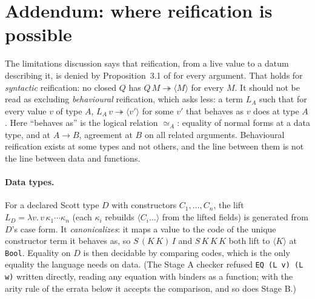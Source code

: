 
\section{Addendum: where reification is possible}\label{app:reify}

The limitations discussion says that reification, from a live value to a datum
describing it, is denied by Proposition~3.1 of \citet{Davis2027} for every
argument.  That holds for \emph{syntactic} reification: no closed $Q$ has
$Q\,M \twoheadrightarrow \langle M\rangle$ for every $M$.  It should not be read
as excluding \emph{behavioural} reification, which asks less: a term $L_A$ such
that for every value $v$ of type $A$, $L_A\,v \twoheadrightarrow \langle v'\rangle$
for some $v'$ that behaves as $v$ does at type $A$.  Here ``behaves as'' is the
logical relation $\simeq_A$: equality of normal forms at a data type, and at
$A \to B$, agreement at $B$ on all related arguments.  Behavioural reification
exists at some types and not others, and the line between them is not the line
between data and functions.

\paragraph{Data types.}  For a declared Scott type $D$ with constructors
$C_1, \ldots, C_n$, the lift $L_D = \lambda v.\, v\,\kappa_1 \cdots \kappa_n$
(each $\kappa_i$ rebuilds $\langle C_i \ldots\rangle$ from the lifted fields)
is generated from $D$'s case form.  It \emph{canonicalizes}: it maps a value to
the code of the unique constructor term it behaves as, so $S\,(K\,K)\,I$ and
$S\,K\,K\,K$ both lift to $\langle K\rangle$ at \texttt{Bool}.  Equality on $D$
is then decidable by comparing codes, which is the only equality the language
needs on data.  (The Stage A checker refused \texttt{EQ (L v) (L w)} written
directly, reading any equation with binders as a function; with the arity
rule of the errata below it accepts the comparison, and so does Stage B.)

